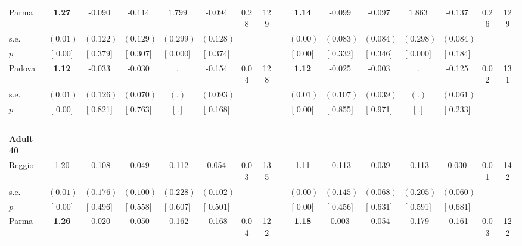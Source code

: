 \begin{longtable}{L{8em} c c c c c c c p{1em} c c c c c c c}
\quad \quad \quad Parma& \textbf{     1.27} &    -0.090 &    -0.114 & $ \mathbf{    1.799}$ &    -0.094 &      0.28 &       129 & & \textbf{     1.14} &    -0.099 &    -0.097 & $ \mathbf{    1.863}$ &    -0.137 &      0.26 &       129  \\*
\quad \quad \quad \quad s.e.& $ (     0.01)$ & $ (    0.122)$ & $ (    0.129)$ & $ (    0.299)$ & $ (    0.128)$ & & & & $ (     0.00)$ & $ (    0.083)$ & $ (    0.084)$ & $ (    0.298)$ & $ (    0.084)$ & &  \\*
\quad \quad \quad \quad $ p$ & [     0.00] & [    0.379] & [    0.307] & [    0.000] & [    0.374] & & & & [     0.00] & [    0.332] & [    0.346] & [    0.000] & [    0.184] & &  \\[1em]
\quad \quad \quad Padova& \textbf{     1.12} &    -0.033 &    -0.030 &         . &    -0.154 &      0.04 &       128 & & \textbf{     1.12} &    -0.025 &    -0.003 &         . &    -0.125 &      0.02 &       131  \\*
\quad \quad \quad \quad s.e.& $ (     0.01)$ & $ (    0.126)$ & $ (    0.070)$ & $ (        .)$ & $ (    0.093)$ & & & & $ (     0.01)$ & $ (    0.107)$ & $ (    0.039)$ & $ (        .)$ & $ (    0.061)$ & &  \\*
\quad \quad \quad \quad $ p$ & [     0.00] & [    0.821] & [    0.763] & [        .] & [    0.168] & & & & [     0.00] & [    0.855] & [    0.971] & [        .] & [    0.233] & &  \\[1em]
~\\[1em]
\quad \quad \textbf{Adult 40} & & & & & & & & & & & & & & & \\* 
\quad \quad \quad Reggio& 1.20 &    -0.108 &    -0.049 &    -0.112 &     0.054 &      0.03 &       135 & & 1.11 &    -0.113 &    -0.039 &    -0.113 &     0.030 &      0.01 &       142  \\*
\quad \quad \quad \quad s.e.& $ (     0.01)$ & $ (    0.176)$ & $ (    0.100)$ & $ (    0.228)$ & $ (    0.102)$ & & & & $ (     0.00)$ & $ (    0.145)$ & $ (    0.068)$ & $ (    0.205)$ & $ (    0.060)$ & &  \\*
\quad \quad \quad \quad $ p$ & [     0.00] & [    0.496] & [    0.558] & [    0.607] & [    0.501] & & & & [     0.00] & [    0.456] & [    0.631] & [    0.591] & [    0.681] & &  \\[1em]
\quad \quad \quad Parma& \textbf{     1.26} &    -0.020 &    -0.050 &    -0.162 &    -0.168 &      0.04 &       122 & & \textbf{     1.18} &     0.003 &    -0.054 &    -0.179 &    -0.161 &      0.03 &       122  \\*

\end{longtable}
